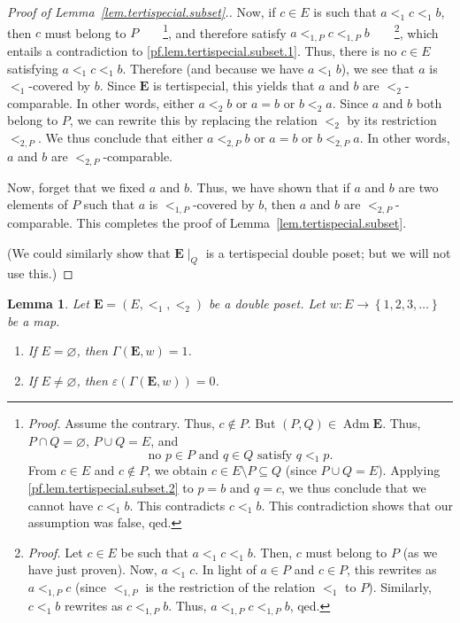 \documentclass[12pt]{article}
\theoremstyle{plain}
\newtheorem{lemma}[theorem]{Lemma}
\theoremstyle{definition}
\theoremstyle{remark}
\newcommand{\Adm}{\operatorname{Adm}}
\newcommand{\EE}{{\mathbf{E}}}
\begin{document}
\begin{proof}[Proof of Lemma~\ref{lem.tertispecial.subset}.]
Now, if $c \in E$ is such that $a <_1 c <_1 b$, then $c$ must
belong to $P$\ \ \ \ \footnote{\textit{Proof.} Assume the
contrary. Thus, $c \notin P$. But
$\left(P, Q\right) \in \Adm \EE$. Thus, $P \cap Q = \varnothing$,
$P \cup Q = E$, and
\begin{equation}
\text{no } p \in P \text{ and } q \in Q \text{ satisfy }
q <_1 p .
\label{pf.lem.tertispecial.subset.2}
\end{equation}
From $c \in E$ and $c \notin P$, we obtain
$c \in E\setminus P \subseteq Q$ (since $P \cup Q = E$).
Applying \eqref{pf.lem.tertispecial.subset.2} to $p = b$ and
$q = c$, we thus conclude that we cannot have $c <_1 b$.
This contradicts $c <_1 b$. This contradiction shows that our
assumption was false, qed.}, and therefore satisfy
$a <_{1,P} c <_{1,P} b$\ \ \ \ \footnote{\textit{Proof.}
Let $c \in E$ be such that $a <_1 c <_1 b$. Then, $c$ must
belong to $P$ (as we have just proven). Now, $a <_1 c$. In
light of $a \in P$ and $c \in P$, this rewrites as
$a <_{1,P} c$ (since $<_{1,P}$ is the restriction of the
relation $<_1$ to $P$). Similarly, $c <_1 b$ rewrites as
$c <_{1,P} b$. Thus, $a <_{1,P} c <_{1,P} b$, qed.},
which entails a
contradiction to \eqref{pf.lem.tertispecial.subset.1}. Thus, there
is no $c \in E$ satisfying $a <_1 c <_1 b$. Therefore (and
because we have $a <_1 b$), we see that $a$ is $<_1$-covered
by $b$. Since $\EE$ is tertispecial,
this yields that $a$ and $b$ are $<_2$-comparable. In other
words, either $a <_2 b$ or $a = b$ or $b <_2 a$. Since $a$ and
$b$ both belong to $P$, we can rewrite this by replacing the
relation $<_2$ by its restriction $<_{2,P}$. We thus conclude
that either $a <_{2,P} b$ or $a = b$ or $b <_{2,P} a$. In other
words, $a$ and $b$ are $<_{2,P}$-comparable.

Now, forget that we fixed $a$ and $b$.
Thus, we have shown that if $a$ and $b$ are two elements
of $P$ such that $a$ is $<_{1,P}$-covered by $b$, then $a$ and
$b$ are $<_{2,P}$-comparable. This completes the proof of
Lemma~\ref{lem.tertispecial.subset}.

(We could similarly show that $\EE\mid_Q$ is a tertispecial
double poset; but we will not use this.)
\end{proof}

\begin{lemma}
\label{lem.Gammaw.empty}Let $\EE = \left( E, <_1, <_2 \right)$ be a
double poset.
Let $w : E \rightarrow \left\{ 1, 2, 3, \ldots \right\}$ be a map.

\begin{enumerate}
\item[(a)] If $E = \varnothing$, then $\Gamma \left( \EE , w \right) = 1$.

\item[(b)] If $E \neq \varnothing$, then
$\varepsilon \left( \Gamma \left( \EE, w \right) \right) = 0$.
\end{enumerate}
\end{lemma}
\end{document}
